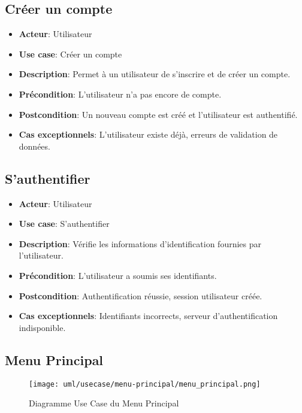 \documentclass{article}
\begin{document}
\subsection{Créer un compte}
\begin{itemize}
    \item \textbf{Acteur}: Utilisateur
    \item \textbf{Use case}: Créer un compte
    \item \textbf{Description}: Permet à un utilisateur de s’inscrire et de créer un compte.
    \item \textbf{Précondition}: L’utilisateur n’a pas encore de compte.
    \item \textbf{Postcondition}: Un nouveau compte est créé et l'utilisateur est authentifié.
    \item \textbf{Cas exceptionnels}: L'utilisateur existe déjà, erreurs de validation de données.
\end{itemize}

\subsection{S'authentifier}
\begin{itemize}
    \item \textbf{Acteur}: Utilisateur
    \item \textbf{Use case}: S'authentifier
    \item \textbf{Description}: Vérifie les informations d'identification fournies par l'utilisateur.
    \item \textbf{Précondition}: L'utilisateur a soumis ses identifiants.
    \item \textbf{Postcondition}: Authentification réussie, session utilisateur créée.
    \item \textbf{Cas exceptionnels}: Identifiants incorrects, serveur d’authentification indisponible.
\end{itemize}
\newpage

\subsection{Menu Principal}

\begin{figure}
    \centering
    \texttt{[image: uml/usecase/menu-principal/menu\_principal.png]}
    \caption{Diagramme Use Case du Menu Principal}
    \label{fig:main-menu}
\end{figure}
\end{document}
